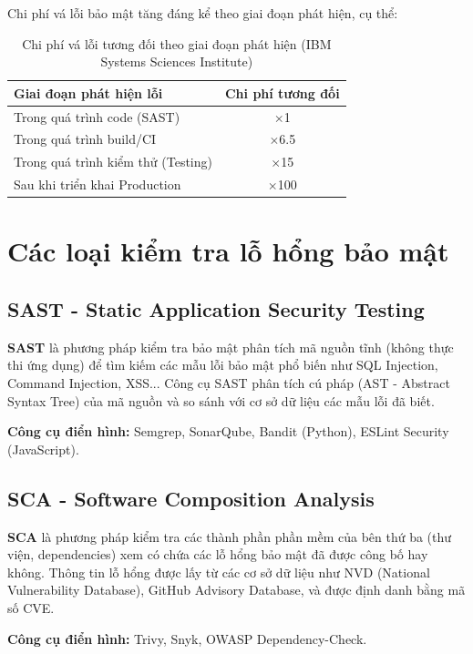 \documentclass[12pt,a4paper]{report}
\begin{document}
Chi phí vá lỗi bảo mật tăng đáng kể theo giai đoạn phát hiện, cụ thể:
\begin{table}[H]
\centering
\caption{Chi phí vá lỗi tương đối theo giai đoạn phát hiện (IBM Systems Sciences Institute)}
\label{tab:fix-cost}
\begin{tabular}{|l|c|}
\hline
\textbf{Giai đoạn phát hiện lỗi} & \textbf{Chi phí tương đối} \\
\hline
Trong quá trình code (SAST) & $\times$1 \\
\hline
Trong quá trình build/CI & $\times$6.5 \\
\hline
Trong quá trình kiểm thử (Testing) & $\times$15 \\
\hline
Sau khi triển khai Production & $\times$100 \\
\hline
\end{tabular}
\end{table}

\section{Các loại kiểm tra lỗ hổng bảo mật}

\subsection{SAST - Static Application Security Testing}

\textbf{SAST} là phương pháp kiểm tra bảo mật phân tích mã nguồn tĩnh (không thực thi ứng dụng) để tìm kiếm các mẫu lỗi bảo mật phổ biến như SQL Injection, Command Injection, XSS... Công cụ SAST phân tích cú pháp (AST - Abstract Syntax Tree) của mã nguồn và so sánh với cơ sở dữ liệu các mẫu lỗi đã biết.

\textbf{Công cụ điển hình:} Semgrep, SonarQube, Bandit (Python), ESLint Security (JavaScript).

\subsection{SCA - Software Composition Analysis}

\textbf{SCA} là phương pháp kiểm tra các thành phần phần mềm của bên thứ ba (thư viện, dependencies) xem có chứa các lỗ hổng bảo mật đã được công bố hay không. Thông tin lỗ hổng được lấy từ các cơ sở dữ liệu như NVD (National Vulnerability Database), GitHub Advisory Database, và được định danh bằng mã số CVE.

\textbf{Công cụ điển hình:} Trivy, Snyk, OWASP Dependency-Check.
\end{document}
